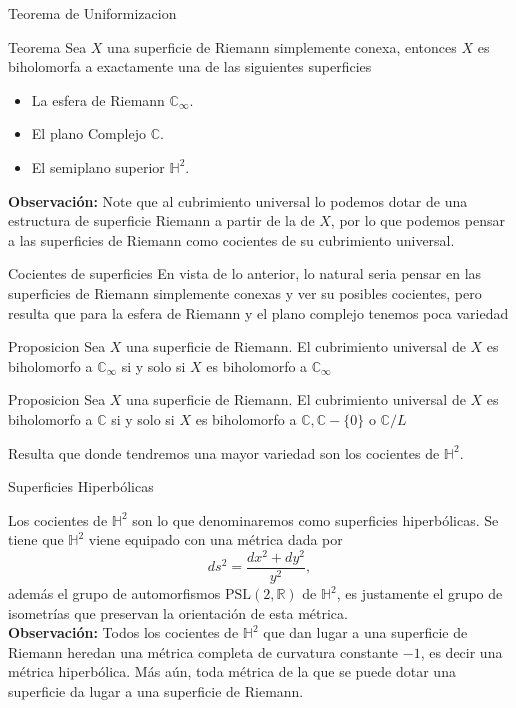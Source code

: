 \documentclass[xcolor=dvipsnames,10pt]{beamer}
\newcommand\R{\ensuremath{\mathbb{R}}}
\newcommand\C{\ensuremath{\mathbb{C}}}
\newcommand\Hs{\ensuremath{\mathbb{H}}}
\begin{document}
\begin{frame}{Teorema de Uniformizacion}
    \begin{block}{Teorema}
        Sea $X$ una superficie de Riemann simplemente conexa, entonces $X$ es biholomorfa a exactamente una de las siguientes superficies
        \begin{itemize}
            \item La esfera de Riemann $\C_{\infty}.$
            \item El plano Complejo $\C.$
            \item El semiplano superior $\Hs^2.$
        \end{itemize}
    \end{block}
    \textbf{Observación:} Note que al cubrimiento universal lo podemos dotar de una estructura de superficie Riemann a partir de la de $X$, por lo que podemos pensar a las superficies de Riemann como cocientes de su cubrimiento universal.  
\end{frame}
\begin{frame}{Cocientes de superficies}
    En vista de lo anterior, lo natural seria pensar en las superficies de Riemann simplemente conexas y ver su posibles cocientes, pero resulta que para la esfera de Riemann y el plano complejo tenemos poca variedad
    \begin{block}{Proposicion}
        Sea $X$ una superficie de Riemann. El cubrimiento universal de $X$ es biholomorfo a $\C_\infty$ si y solo si $X$ es biholomorfo a $\C_\infty$
    \end{block}
    \begin{block}{Proposicion}
        Sea $X$ una superficie de Riemann. El cubrimiento universal de $X$ es biholomorfo a $\C$ si y solo si $X$ es biholomorfo a $\C,\C-\{0\}$ o $\C/L$
    \end{block}
    Resulta que donde tendremos una mayor variedad son los cocientes de $\Hs^2$.
\end{frame}
\begin{frame}{Superficies Hiperbólicas}

Los cocientes de $\Hs^2$ son lo que denominaremos como superficies hiperbólicas. Se tiene que $\Hs^2$ viene equipado con una métrica dada por
$$ds^2=\dfrac{dx^2+dy^2}{y^2},$$
además el grupo de automorfismos $\text{PSL}(2,\R)$ de $\Hs^2$, es justamente el grupo de isometrías que preservan la orientación de esta métrica.\\
\vspace{0.3cm}
\textbf{Observación:} Todos los cocientes de $\Hs^2$ que dan lugar a una superficie de Riemann heredan una métrica completa de curvatura constante $-1$, es decir una métrica hiperbólica. Más aún, toda métrica de la que se puede dotar una superficie da lugar a una superficie de Riemann.
    
\end{frame}
\end{document}
